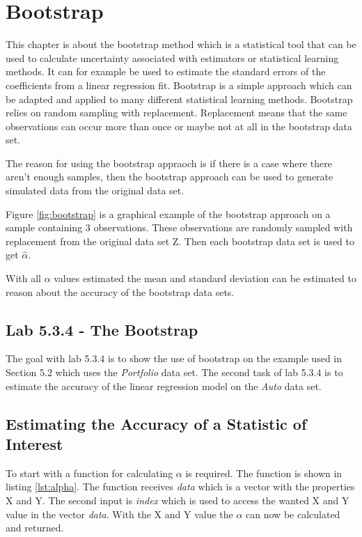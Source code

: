 \section{Bootstrap}
This chapter is about the bootstrap method which is a statistical tool that can be used to calculate uncertainty associated with estimators or statistical learning methods. It can for example be used to estimate the standard errors of the coefficients from a linear regression fit. Bootstrap is a simple approach which can be adapted and applied to many different statistical learning methods. Bootstrap relies on random sampling with replacement. Replacement means that the same observations can occur more than once or maybe not at all in the bootstrap data set. 

The reason for using the bootstrap appraoch is if there is a case where there aren't enough samples, then the bootstrap approach can be used to generate simulated data from the original data set.


Figure \ref{fig:bootstrap} is a graphical example of the bootstrap approach on a sample containing 3 observations. These observations are randomly sampled with replacement from the original data set Z. Then each bootstrap data set is used to get $\hat{\alpha}$.

With all $\alpha$ values estimated the mean and standard deviation can be estimated to reason about the accuracy of the bootstrap data sets.

\subsection{Lab 5.3.4 - The Bootstrap}

The goal with lab 5.3.4 is to show the use of bootstrap on the example used in Section 5.2\citep{ISLR} which uses the \emph{Portfolio} data set. The second task of lab 5.3.4 is to estimate the accuracy of the linear regression model on the \emph{Auto} data set.

\subsection{Estimating the Accuracy of a Statistic of Interest}

To start with a function for calculating $\alpha$ is required. The function is shown in listing \ref{lst:alpha}. The function receives \emph{data} which is a vector with the properties X and Y. The second input is \emph{index} which is used to access the wanted X and Y value in the vector \emph{data}.
With the X and Y value the $\alpha$ can now be calculated and returned.

